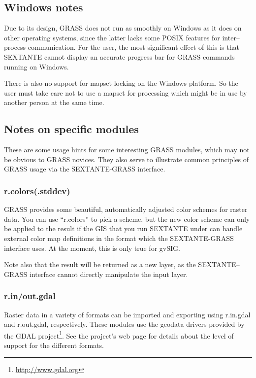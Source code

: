 \subsection{Windows notes}

Due to its design, GRASS does not run as smoothly on Windows as it does on other operating systems, since the latter lacks some POSIX features for inter--process communication. For the user, the most significant effect of this is that SEXTANTE cannot display an accurate progress bar for GRASS commands running on Windows.

There is also no support for mapset locking on the Windows platform. So the user must take care not to use a mapset for processing which might be in use by another person at the same time.

\subsection{Notes on specific modules}

These are some usage hints for some interesting GRASS modules, which may not be obvious to GRASS novices. They also serve to illustrate common principles of GRASS usage via the SEXTANTE-GRASS interface.

\subsubsection{r.colors(.stddev)}

GRASS provides some beautiful, automatically adjusted color schemes for raster data. You can use ``r.colors'' to pick a scheme, but the new color scheme can only be applied to the result if the GIS that you run SEXTANTE under can handle external color map definitions in the format which the SEXTANTE-GRASS interface uses. At the moment, this is only true for gvSIG.

Note also that the result will be returned as a new layer, as the SEXTANTE--GRASS interface cannot directly manipulate the input layer.

\subsubsection{r.in/out.gdal}

Raster data in a variety of formats can be imported and exporting using r.in.gdal and r.out.gdal, respectively. These modules use the geodata drivers provided by the GDAL project\footnote{\url{http://www.gdal.org}}. See the project's web page for details about the level of support for the different formats.

